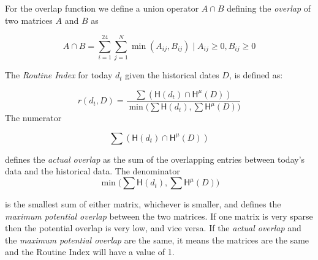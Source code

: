 For the overlap function we define a union operator $A \cap B$ defining the \textit{overlap} of two matrices $A$ and $B$ as 

\begin{equation}
\label{eq:overlap-function}
    A \cap B = \sum_{i=1}^{24} \sum_{j=1}^{N} \min (A_{ij}, B_{ij}) \;|\; A_{ij} \geq 0, B_{ij} \geq 0
\end{equation}

The \textit{Routine Index} for today $d_t$ given the historical dates $D$, is defined as: 

$$r(d_t, D) = \frac{\sum (\mathsf{H}(d_t) \cap \mathsf{H}^{\mu} (D) )}{\min \Big(\sum \mathsf{H}(d_t), \sum \mathsf{H}^{\mu} (D) \Big)}$$
The numerator 

$$\sum (\mathsf{H}(d_t) \cap \mathsf{H}^{\mu} (D) )$$

defines the \textit{actual overlap} as the sum of the overlapping entries between today's data and the historical data. The denominator 
$$\min \Big(\sum \mathsf{H}(d_t), \sum \mathsf{H}^{\mu} (D) \Big)$$ 

is the smallest sum of either matrix, whichever is smaller, and defines the \textit{maximum potential overlap} between the two matrices. If one matrix is very sparse then the potential overlap is very low, and vice versa. If the \textit{actual overlap} and the \textit{maximum potential overlap} are the same, it means the matrices are the same and the Routine Index will have a value of 1. 

